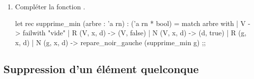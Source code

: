 \documentclass[a4paper,french,bookmarks]{article}
\newcommand{\rouge}{{\color{main9} rouge}}
\DeclareMathOperator{\etiquettes}{etiquettes}
\begin{document}
\begin{enumerate}[resume]
\begin{enumerate}
        \itt \textbf{Sortie :} un arbre $t'$ et un booléen $b'$ tels que :
            \begin{enumerate}
                \itstar $t'$ est un sous-arbre \rouge{}-noir \textbf{presque correct} ;
                
                \itstar $\etiquettes\left(t'\right) = \etiquettes\left(t\right)$ ;
                
                \itstar en notant $h$ la hauteur de $t$ et $h'$ la hauteur de $t'$, on a $\left\lbrace\begin{array}{rl}
                    b' = \text{\camlline{false}} &\text{ssi} \ h' = h  \\
                    b' = \text{\camlline{true}} &\text{ssi} \ h' = h - 1
                \end{array}\right.$ 
            \end{enumerate}
    \end{enumerate}
    
    \newpage
    
    \begin{ocaml}
let rendre_noir (t : 'a rn) : 'a rn = match t with
    | R(g, x, d) -> N(g, x, d)
    | _ -> t
;;

let repare_noir_gauche ((t, b) : 'a rn * bool) : ('a rn * bool) =
    if not b then (t, false) else match t with
    | R(a, x, N(b, y, c)) | N(a, x, N(b, y, c))
     -> (N(R(a, x, rendre_noir b), y, c), false)
    | N(R(a, x, b), y, c)
     -> (N(N(a, x, b), y, c), false)
    | N(a, x, R(N(b, y, c), z, N(d, t, e))) ->
     (N(N(a, x, R(rendre_noir b, y, rendre_noir c)),z, N(d, t, e)), false)
    | _ -> (t, true)
;;
    \end{ocaml}
    
    \item Compléter la fonction .
    
    \begin{ocaml}
let rec supprime_min (arbre : 'a rn) : ('a rn * bool) =
match arbre with
    | V -> failwith "vide"
    | R (V, x, d) -> (V, false)
    | N (V, x, d) -> (d, true)
    | R (g, x, d) | N (g, x, d) -> repare_noir_gauche (supprime_min g)
;;
    \end{ocaml}
        
\end{enumerate}

\subsection{Suppression d'un élément quelconque}
\end{document}

